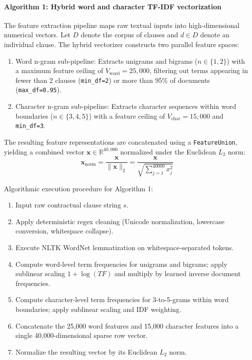 \paragraph*{Algorithm 1: Hybrid word and character TF-IDF vectorization}
The feature extraction pipeline maps raw textual inputs into high-dimensional numerical vectors. Let $D$ denote the corpus of clauses and $d \in D$ denote an individual clause. The hybrid vectorizer constructs two parallel feature spaces:
\begin{enumerate}
    \item Word n-gram sub-pipeline: Extracts unigrams and bigrams ($n \in \{1, 2\}$) with a maximum feature ceiling of $V_{\text{word}} = 25,000$, filtering out terms appearing in fewer than 2 clauses (\texttt{min\_df=2}) or more than 95\% of documents (\texttt{max\_df=0.95}).
    \item Character n-gram sub-pipeline: Extracts character sequences within word boundaries ($n \in \{3, 4, 5\}$) with a feature ceiling of $V_{\text{char}} = 15,000$ and \texttt{min\_df=3}.
\end{enumerate}
The resulting feature representations are concatenated using a \texttt{FeatureUnion}, yielding a combined vector $\mathbf{x} \in \mathbb{R}^{40,000}$ normalized under the Euclidean $L_2$ norm:
\begin{equation}
    \mathbf{x}_{\text{norm}} = \frac{\mathbf{x}}{\|\mathbf{x}\|_2} = \frac{\mathbf{x}}{\sqrt{\sum_{j=1}^{40000} x_j^2}}
    \label{eq:l2_norm}
\end{equation}

\noindent Algorithmic execution procedure for Algorithm 1:
\begin{enumerate}
    \item Input raw contractual clause string $s$.
    \item Apply deterministic regex cleaning (Unicode normalization, lowercase conversion, whitespace collapse).
    \item Execute NLTK WordNet lemmatization on whitespace-separated tokens.
    \item Compute word-level term frequencies for unigrams and bigrams; apply sublinear scaling $1 + \log(TF)$ and multiply by learned inverse document frequencies.
    \item Compute character-level term frequencies for 3-to-5-grams within word boundaries; apply sublinear scaling and IDF weighting.
    \item Concatenate the 25,000 word features and 15,000 character features into a single 40,000-dimensional sparse row vector.
    \item Normalize the resulting vector by its Euclidean $L_2$ norm.
\end{enumerate}

